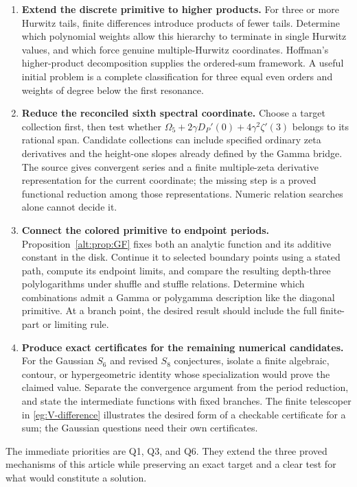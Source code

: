 \begin{enumerate}[label=\textbf{Q\arabic*.},ref=Q\arabic*,itemsep=10pt]
\item \textbf{Extend the discrete primitive to higher products.}
For three or more Hurwitz tails, finite differences introduce products
of fewer tails. Determine which polynomial weights allow this
hierarchy to terminate in single Hurwitz values, and which force
genuine multiple-Hurwitz coordinates. Hoffman's higher-product
decomposition \cite{Hoffman} supplies the ordered-sum framework.
A useful initial problem is a complete classification for three
equal even orders and weights of degree below the first resonance.

\item \textbf{Reduce the reconciled sixth spectral coordinate.}
Choose a target collection first, then test whether
$\Omega_5+2\gamma D_P'(0)+4\gamma^2\zeta'(3)$ belongs to its
rational span. Candidate collections can include specified ordinary
zeta derivatives and the height-one slopes already defined by the
Gamma bridge. The source gives convergent series and a finite
multiple-zeta derivative representation for the current coordinate;
the missing step is a proved functional reduction among those
representations. Numeric relation searches alone cannot decide it.

\item \textbf{Connect the colored primitive to endpoint periods.}
Proposition~\ref{alt:prop:GF} fixes both an analytic function and its
additive constant in the disk. Continue it to selected boundary
points using a stated path, compute its endpoint limits, and compare
the resulting depth-three polylogarithms under shuffle and stuffle
relations. Determine which combinations admit a Gamma or polygamma
description like the diagonal primitive. At a branch point, the
desired result should include the full finite-part or limiting rule.

\item \textbf{Produce exact certificates for the remaining numerical candidates.}
For the Gaussian $S_6$ and revised $S_8$ conjectures, isolate a finite
algebraic, contour, or hypergeometric identity whose specialization
would prove the claimed value. Separate the convergence argument
from the period reduction, and state the intermediate functions with
fixed branches. The finite telescoper in \eqref{eg:V-difference}
illustrates the desired form of a checkable certificate for a sum;
the Gaussian questions need their own certificates.
\end{enumerate}

The immediate priorities are Q1, Q3, and Q6. They extend the three
proved mechanisms of this article while preserving an exact target
and a clear test for what would constitute a solution.
